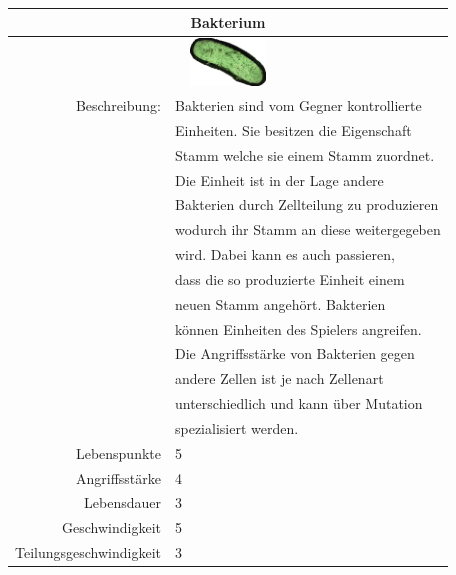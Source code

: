\documentclass[11pt]{article}
\begin{document}
\begin{tabular}{|r|l|}
\hline
\multicolumn{2}{c}{Bakterium}\\\hline\hline
\multicolumn{2}{c}{\includegraphics[width=2cm]{bakteriumorig.png}}\\\hline\hline
Beschreibung:	& Bakterien sind vom Gegner kontrollierte\\
			& Einheiten. Sie besitzen die  Eigenschaft\\
			& Stamm welche sie einem Stamm zuordnet.\\
			& Die Einheit ist in der Lage andere\\
			& Bakterien durch Zellteilung zu produzieren\\
			& wodurch ihr Stamm an diese weitergegeben\\
			& wird. Dabei kann es auch passieren,\\
			& dass die so produzierte Einheit einem\\
			& neuen Stamm angeh\"ort. Bakterien\\
			& k\"onnen Einheiten des Spielers angreifen.\\
			& Die Angriffsst\"arke von Bakterien gegen\\
			& andere Zellen ist je nach Zellenart\\
			& unterschiedlich und kann \"uber Mutation\\
			& spezialisiert werden.\\\hline
Lebenspunkte	& 5\\\hline
Angriffsst\"arke	& 4\\\hline
Lebensdauer		& 3\\\hline
Geschwindigkeit	& 5\\\hline
Teilungsgeschwindigkeit	& 3\\\hline
\end{tabular}
\end{document}
